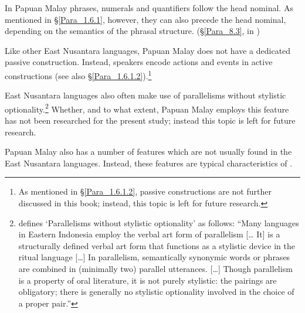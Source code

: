 {In Papuan Malay  phrases, numerals and quantifiers follow the head nominal. As mentioned in §\ref{Para_1.6.1}, however, they can also precede the head nominal, depending on the semantics of the phrasal structure. (§\ref{Para_8.3}, in )


\newpage 
Like other East Nusantara  languages, Papuan Malay does not have a dedicated passive construction. Instead, speakers encode actions and events in active constructions (see also §\ref{Para_1.6.1.2}).\footnote{As mentioned in §\ref{Para_1.6.1.2}, passive constructions are not further discussed in this book; instead, this topic is left for future research.}

 
 
East Nusantara  languages also often make use of parallelisms without stylistic optionality.\footnote{\citet[370, 371]{Klamer.2002} defines ‘Parallelisms without stylistic optionality’ as follows:  ``Many languages in Eastern Indonesia employ the verbal art form of parallelism [{\ldots} It] is a structurally defined verbal art form that functions as a stylistic device in the ritual language [\ldots] In parallelism, semantically synonymic words or phrases are combined in (minimally two) parallel utterances. [\ldots] Though parallelism is a property of oral literature, it is not purely stylistic: the pairings are obligatory; there is generally no stylistic optionality involved in the choice of a proper pair.''} Whether, and to what extent, Papuan Malay employs this feature has not been researched for the present study; instead this topic is left for future research.

 
Papuan Malay also has a number of features which are not usually found in the East Nusantara  languages. Instead, these features are typical characteristics of .



}
